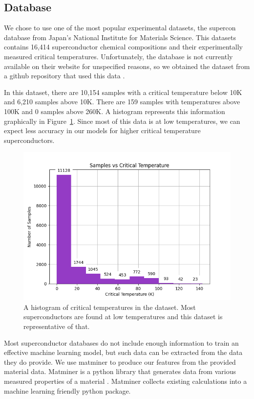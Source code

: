 \documentclass[twocolumn, nofootinbib, secnumarabic, amssymb, nobibnotes, aps, prd]{revtex4-2}
\begin{document}
\subsection{Database}
We chose to use one of the most popular experimental datasets, the supercon database from Japan's National Institute for Materials Science. This datasets contains 16,414 superconductor chemical compositions and their experimentally measured critical temperatures. Unfortunately, the database is not currently available on their website for unspecified reasons, so we obtained the dataset from a github repository that used this data \cite{vstanev1_2018}. 

In this dataset, there are 10,154 samples with a critical temperature below 10K and 6,210 samples above 10K. There are 159 samples with temperatures above 100K and 0 samples above 260K. A histogram represents this information graphically in Figure~\ref{fig:data-histogram}. Since most of this data is at low temperatures, we can expect less accuracy in our models for higher critical temperature superconductors.

 \begin{figure}[!htb]
    \centering %
    \includegraphics[width=\columnwidth]{dataset_histogram.png}
    \caption{A histogram of critical temperatures in the dataset. Most superconductors are found at low temperatures and this dataset is representative of that.} %
    \label{fig:data-histogram}
 \end{figure}

Most superconductor databases do not include enough information to train an effective machine learning model, but such data can be extracted from the data they do provide. We use matminer to produce our features from the provided material data. Matminer is a python library that generates data from various measured properties of a material \cite{WARD201860}. Matminer collects existing calculations into a machine learning friendly python package. %
\end{document}
